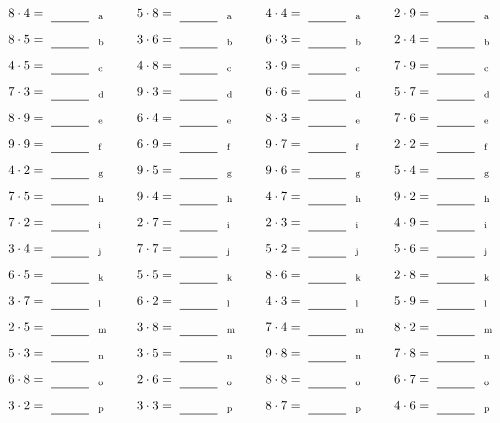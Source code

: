 \documentclass
[
  draft    = true,
  fontsize = 11pt,
  parskip  = half-
]
{scrartcl}
\begin{document}
\par\vfill\par
\begin{align*}
    \pline{8\cdot4}&=\rline{a}
  & \pline{5\cdot8}&=\rline{a}
  & \pline{4\cdot4}&=\rline{a}
  & \pline{2\cdot9}&=\rline{a} \\[1ex]
    \pline{8\cdot5}&=\rline{b}
  & \pline{3\cdot6}&=\rline{b}
  & \pline{6\cdot3}&=\rline{b}
  & \pline{2\cdot4}&=\rline{b} \\[1ex]
    \pline{4\cdot5}&=\rline{c}
  & \pline{4\cdot8}&=\rline{c}
  & \pline{3\cdot9}&=\rline{c}
  & \pline{7\cdot9}&=\rline{c} \\[1ex]
    \pline{7\cdot3}&=\rline{d}
  & \pline{9\cdot3}&=\rline{d}
  & \pline{6\cdot6}&=\rline{d}
  & \pline{5\cdot7}&=\rline{d} \\[1ex]
    \pline{8\cdot9}&=\rline{e}
  & \pline{6\cdot4}&=\rline{e}
  & \pline{8\cdot3}&=\rline{e}
  & \pline{7\cdot6}&=\rline{e} \\[1ex]
    \pline{9\cdot9}&=\rline{f}
  & \pline{6\cdot9}&=\rline{f}
  & \pline{9\cdot7}&=\rline{f}
  & \pline{2\cdot2}&=\rline{f} \\[1ex]
    \pline{4\cdot2}&=\rline{g}
  & \pline{9\cdot5}&=\rline{g}
  & \pline{9\cdot6}&=\rline{g}
  & \pline{5\cdot4}&=\rline{g} \\[1ex]
    \pline{7\cdot5}&=\rline{h}
  & \pline{9\cdot4}&=\rline{h}
  & \pline{4\cdot7}&=\rline{h}
  & \pline{9\cdot2}&=\rline{h} \\[1ex]
    \pline{7\cdot2}&=\rline{i}
  & \pline{2\cdot7}&=\rline{i}
  & \pline{2\cdot3}&=\rline{i}
  & \pline{4\cdot9}&=\rline{i} \\[1ex]
    \pline{3\cdot4}&=\rline{j}
  & \pline{7\cdot7}&=\rline{j}
  & \pline{5\cdot2}&=\rline{j}
  & \pline{5\cdot6}&=\rline{j} \\[1ex]
    \pline{6\cdot5}&=\rline{k}
  & \pline{5\cdot5}&=\rline{k}
  & \pline{8\cdot6}&=\rline{k}
  & \pline{2\cdot8}&=\rline{k} \\[1ex]
    \pline{3\cdot7}&=\rline{l}
  & \pline{6\cdot2}&=\rline{l}
  & \pline{4\cdot3}&=\rline{l}
  & \pline{5\cdot9}&=\rline{l} \\[1ex]
    \pline{2\cdot5}&=\rline{m}
  & \pline{3\cdot8}&=\rline{m}
  & \pline{7\cdot4}&=\rline{m}
  & \pline{8\cdot2}&=\rline{m} \\[1ex]
    \pline{5\cdot3}&=\rline{n}
  & \pline{3\cdot5}&=\rline{n}
  & \pline{9\cdot8}&=\rline{n}
  & \pline{7\cdot8}&=\rline{n} \\[1ex]
    \pline{6\cdot8}&=\rline{o}
  & \pline{2\cdot6}&=\rline{o}
  & \pline{8\cdot8}&=\rline{o}
  & \pline{6\cdot7}&=\rline{o} \\[1ex]
    \pline{3\cdot2}&=\rline{p}
  & \pline{3\cdot3}&=\rline{p}
  & \pline{8\cdot7}&=\rline{p}
  & \pline{4\cdot6}&=\rline{p}
\end{align*}
\end{document}
